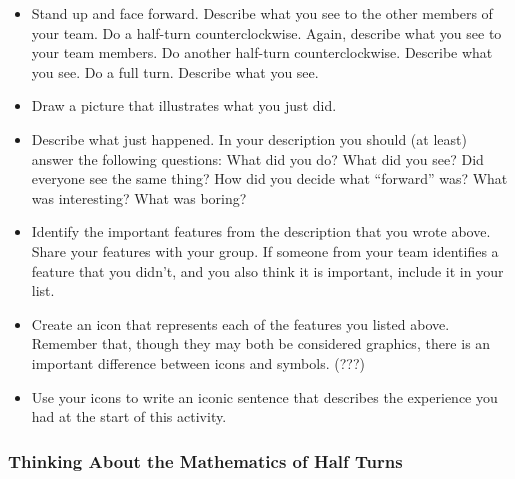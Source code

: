 \documentclass[11pt]{article}
\newenvironment{task}
	{\begin{mdframed}[linecolor=lightgray, linewidth=3pt]\raggedright}
	{\end{mdframed}}
\theoremstyle{definition}
\begin{document}
\begin{task}
\begin{itemize}
  \item Stand up and face forward. Describe what you see to the other members of your team. Do a half-turn counterclockwise. Again, describe what you see to your team members. 
    Do another half-turn counterclockwise. Describe what you see. Do a full turn. Describe what you see. 
  \item Draw a picture that illustrates what you just did.
  \item Describe what just happened. In your description you should (at least) answer the following questions: What did you do? What did you see? Did everyone see the same thing? How did you decide what ``forward'' was? 
    What was interesting? What was boring?
  \item Identify the important features from the description that you wrote above. Share your features with your group. If someone from your team identifies a feature that you didn’t, and you also 
    think it is important, include it in your list.
  \item Create an icon that represents each of the features you listed above. Remember that, though they may both be considered graphics, there is an important difference between icons and symbols. (???)
  \item Use your icons to write an iconic sentence that describes the experience you had at the start of this activity.
\end{itemize}
\end{task}

\subsubsection{Thinking About the Mathematics of Half Turns}
\end{document}
